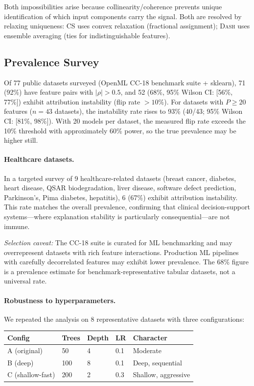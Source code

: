 \documentclass{jmlr}
\newcommand{\DASH}{\textsc{Dash}}
\begin{document}
Both impossibilities arise because collinearity/coherence prevents unique identification of which input components carry the signal. Both are resolved by relaxing uniqueness: CS uses convex relaxation (fractional assignment); \DASH{} uses ensemble averaging (ties for indistinguishable features).

\subsection{Prevalence Survey}
\label{sec:prevalence}

Of 77 public datasets surveyed (OpenML CC-18 benchmark suite + sklearn), 71 (92\%) have feature pairs with $|\rho| > 0.5$, and 52 (68\%, 95\% Wilson CI: [56\%, 77\%]) exhibit attribution instability (flip rate $> 10\%$). For datasets with $P \geq 20$ features ($n = 43$ datasets), the instability rate rises to 93\% (40/43; 95\% Wilson CI: [81\%, 98\%]). With 20 models per dataset, the measured flip rate exceeds the 10\% threshold with approximately 60\% power, so the true prevalence may be higher still.

\paragraph{Healthcare datasets.}
In a targeted survey of 9 healthcare-related datasets (breast cancer, diabetes, heart disease, QSAR biodegradation, liver disease, software defect prediction, Parkinson's, Pima diabetes, hepatitis), 6 (67\%) exhibit attribution instability. This rate matches the overall prevalence, confirming that clinical decision-support systems---where explanation stability is particularly consequential---are not immune.

\emph{Selection caveat:} The CC-18 suite is curated for ML benchmarking and may overrepresent datasets with rich feature interactions. Production ML pipelines with carefully decorrelated features may exhibit lower prevalence. The 68\% figure is a prevalence estimate for benchmark-representative tabular datasets, not a universal rate.

\paragraph{Robustness to hyperparameters.}
We repeated the analysis on 8 representative datasets with three configurations:

\begin{center}
\small
\begin{tabular}{@{}lllll@{}}
\toprule
Config & Trees & Depth & LR & Character \\
\midrule
A (original) & 50 & 4 & 0.1 & Moderate \\
B (deep) & 100 & 8 & 0.1 & Deep, sequential \\
C (shallow-fast) & 200 & 2 & 0.3 & Shallow, aggressive \\
\bottomrule
\end{tabular}
\end{center}
\end{document}
